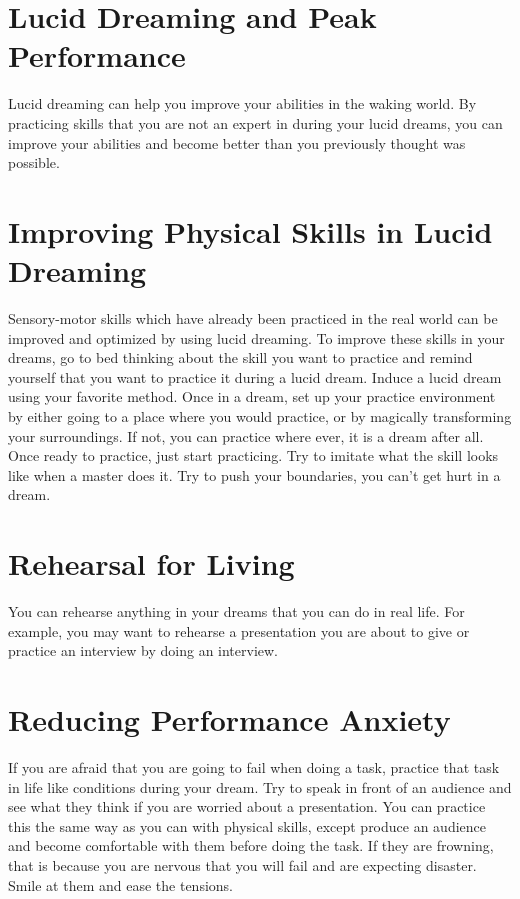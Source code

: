 \documentclass{book}
\begin{document}
\section{Lucid Dreaming and Peak Performance}
Lucid dreaming can help you improve your abilities in the waking world. By practicing skills that you are not an expert in during your lucid dreams, you can improve your abilities and become better than you previously thought was possible. 

\section{Improving Physical Skills in Lucid Dreaming}
Sensory-motor skills which have already been practiced in the real world can be improved and optimized by using lucid dreaming. To improve these skills in your dreams, go to bed thinking about the skill you want to practice and remind yourself that you want to practice it during a lucid dream. Induce a lucid dream using your favorite method. Once in a dream, set up your practice environment by either going to a place where you would practice, or by magically transforming your surroundings. If not, you can practice where ever, it is a dream after all. Once ready to practice, just start practicing. Try to imitate what the skill looks like when a master does it. Try to push your boundaries, you can't get hurt in a dream. 

\section{Rehearsal for Living}
You can rehearse anything in your dreams that you can do in real life. For example, you may want to rehearse a presentation you are about to give or practice an interview by doing an interview. 

\section{Reducing Performance Anxiety}
If you are afraid that you are going to fail when doing a task, practice that task in life like conditions during your dream. Try to speak in front of an audience and see what they think if you are worried about a presentation. You can practice this the same way as you can with physical skills, except produce an audience and become comfortable with them before doing the task. If they are frowning, that is because you are nervous that you will fail and are expecting disaster. Smile at them and ease the tensions. 
\end{document}
